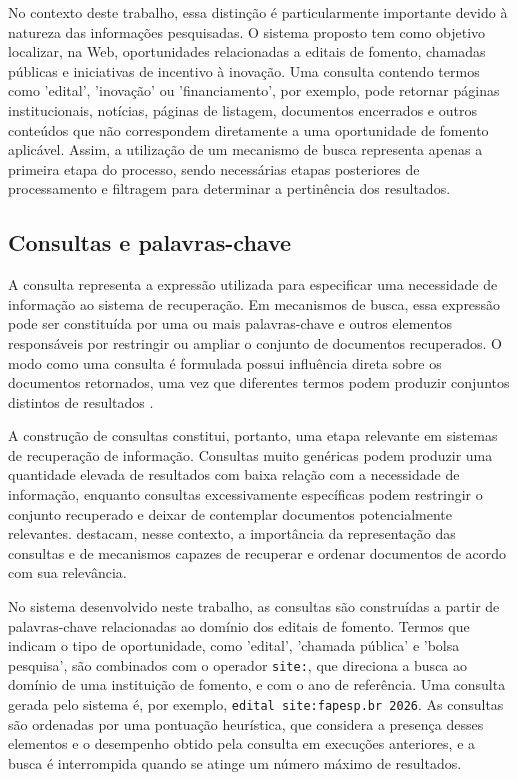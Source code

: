 No contexto deste trabalho, essa distinção é particularmente importante devido à natureza das informações pesquisadas. O sistema proposto tem como objetivo localizar, na Web, oportunidades relacionadas a editais de fomento, chamadas públicas e iniciativas de incentivo à inovação. Uma consulta contendo termos como 'edital', 'inovação' ou 'financiamento', por exemplo, pode retornar páginas institucionais, notícias, páginas de listagem, documentos encerrados e outros conteúdos que não correspondem diretamente a uma oportunidade de fomento aplicável. Assim, a utilização de um mecanismo de busca representa apenas a primeira etapa do processo, sendo necessárias etapas posteriores de processamento e filtragem para determinar a pertinência dos resultados.

\subsection{Consultas e palavras-chave}

A consulta representa a expressão utilizada para especificar uma necessidade de informação ao sistema de recuperação. Em mecanismos de busca, essa expressão pode ser constituída por uma ou mais palavras-chave e outros elementos responsáveis por restringir ou ampliar o conjunto de documentos recuperados. O modo como uma consulta é formulada possui influência direta sobre os documentos retornados, uma vez que diferentes termos podem produzir conjuntos distintos de resultados \cite{manning2008}.

A construção de consultas constitui, portanto, uma etapa relevante em sistemas de recuperação de informação. Consultas muito genéricas podem produzir uma quantidade elevada de resultados com baixa relação com a necessidade de informação, enquanto consultas excessivamente específicas podem restringir o conjunto recuperado e deixar de contemplar documentos potencialmente relevantes.  destacam, nesse contexto, a importância da representação das consultas e de mecanismos capazes de recuperar e ordenar documentos de acordo com sua relevância.

No sistema desenvolvido neste trabalho, as consultas são construídas a partir de palavras-chave relacionadas ao domínio dos editais de fomento. Termos que indicam o tipo de oportunidade, como 'edital', 'chamada pública' e 'bolsa pesquisa', são combinados com o operador \texttt{site:}, que direciona a busca ao domínio de uma instituição de fomento, e com o ano de referência. Uma consulta gerada pelo sistema é, por exemplo, \texttt{edital site:fapesp.br 2026}. As consultas são ordenadas por uma pontuação heurística, que considera a presença desses elementos e o desempenho obtido pela consulta em execuções anteriores, e a busca é interrompida quando se atinge um número máximo de resultados.

